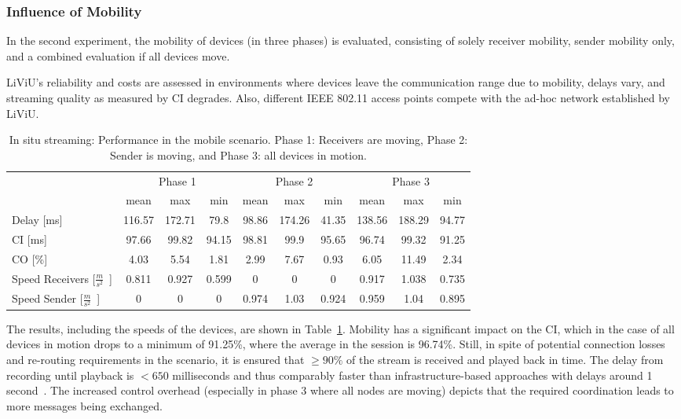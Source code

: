 \subsubsection{Influence of Mobility}
In the second experiment, the mobility of devices (in three phases) is evaluated, consisting of solely receiver mobility, sender mobility only, and a combined evaluation if all devices move.

\ac{LiViU}'s reliability and costs are assessed in environments where devices leave the communication range due to mobility, delays vary, and streaming quality as measured by \ac{CI} degrades.
Also, different \ac{IEEE} 802.11 access points compete with the ad-hoc network established by \ac{LiViU}.

 \begin{table}[h]
 	\centering
 \caption[In situ streaming: Performance in the mobile scenario.]{In situ streaming: Performance in the mobile scenario. Phase 1: Receivers are moving, Phase 2: Sender is moving, and Phase 3: all devices in motion.}
 	\begin{tabular}{l ccc ccc ccc}%
 		&  \multicolumn{3}{c}{Phase 1} &   \multicolumn{3}{c}{Phase 2} &\multicolumn{3}{c}{Phase 3}  \\
 		\specialcell{Run}& mean & max & min & mean & max & min& mean & max &min \\ \toprule
 		Delay [ms]& 116.57 & 172.71 & 79.8 & 98.86 & 174.26 & 41.35 & 138.56 & 188.29 & 94.77\\
 		CI [ms]& 97.66 & 99.82 & 94.15 & 98.81 & 99.9 & 95.65 & 96.74 & 99.32 & 91.25\\ 
 		CO [\%]	& 4.03 & 5.54 & 1.81 & 2.99 & 7.67 & 0.93 & 6.05 & 11.49 & 2.34 \\ 
 		Speed Receivers [\unit{$\frac{m}{s^2}$}]& 0.811 & 0.927 & 0.599& 0 & 0 & 0 & 0.917 & 1.038 & 0.735 \\ 
 		Speed Sender [\unit{$\frac{m}{s^2}$}]& 0 & 0 &0 & 0.974 & 1.03 & 0.924& 0.959& 1.04& 0.895 \\ 
 		\bottomrule
 	\end{tabular}
 	\label{tab:530_mobility_scenario_eval}
 \end{table} 

The results, including the speeds of the devices, are shown in Table~\ref{tab:530_mobility_scenario_eval}.
Mobility has a significant impact on the \ac{CI}, which in the case of all devices in motion drops to a minimum of 91.25\%, where the average in the session is 96.74\%.
Still, in spite of potential connection losses and re-routing requirements in the scenario, it is ensured that $\geq 90\%$ of the stream is received and played back in time.
The delay from recording until playback is $< 650$ milliseconds and thus comparably faster than infrastructure-based approaches with delays around 1 second~\cite{Dezfuli2013}.
The increased control overhead (especially in phase 3 where all nodes are moving) depicts that the required coordination leads to more messages being exchanged.

